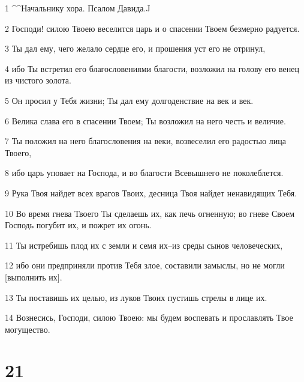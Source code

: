 \par 1 ^^Начальнику хора. Псалом Давида.^^
\par 2 Господи! силою Твоею веселится царь и о спасении Твоем безмерно радуется.
\par 3 Ты дал ему, чего желало сердце его, и прошения уст его не отринул,
\par 4 ибо Ты встретил его благословениями благости, возложил на голову его венец из чистого золота.
\par 5 Он просил у Тебя жизни; Ты дал ему долгоденствие на век и век.
\par 6 Велика слава его в спасении Твоем; Ты возложил на него честь и величие.
\par 7 Ты положил на него благословения на веки, возвеселил его радостью лица Твоего,
\par 8 ибо царь уповает на Господа, и во благости Всевышнего не поколеблется.
\par 9 Рука Твоя найдет всех врагов Твоих, десница Твоя найдет ненавидящих Тебя.
\par 10 Во время гнева Твоего Ты сделаешь их, как печь огненную; во гневе Своем Господь погубит их, и пожрет их огонь.
\par 11 Ты истребишь плод их с земли и семя их--из среды сынов человеческих,
\par 12 ибо они предприняли против Тебя злое, составили замыслы, но не могли [выполнить их].
\par 13 Ты поставишь их целью, из луков Твоих пустишь стрелы в лице их.
\par 14 Вознесись, Господи, силою Твоею: мы будем воспевать и прославлять Твое могущество.

\chapter{21}

